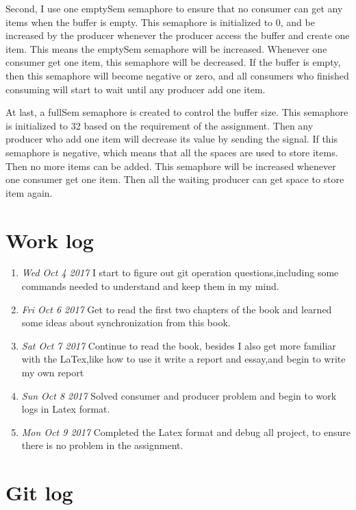 \documentclass[10pt,draftclsnofoot,peerreview,letterpaper,onecolumn,]{IEEEtran}
\begin{document}
Second, I use one emptySem semaphore to ensure that no consumer can get any items when the buffer is empty. This semaphore is initialized to 0, and be increased by the producer whenever the producer access the buffer and create one item. This means the emptySem semaphore will be increased. Whenever one consumer get one item, this semaphore will be decreased. If the buffer is empty, then this semaphore will become negative or zero, and all consumers who finished consuming will start to wait until any producer add one item.

At last, a fullSem semaphore is created to control the buffer size. This semaphore is initialized to 32 based on the requirement of the assignment. Then any producer who add one item will decrease its value by sending the signal. If this semaphore is negative, which means that all the spaces are used to store items. Then no more items can be added. This semaphore will be increased whenever one consumer get one item. Then all the waiting producer can get space to store item again.

\section{Work log}
\begin{enumerate}
\item \emph{Wed Oct 4 2017} I start to figure out git operation questions,including some commands needed to understand and keep them in my mind.
\item \emph{Fri Oct 6 2017} Get to read the first two chapters of the book and learned some ideas about synchronization from this book.
\item \emph{Sat Oct 7 2017} Continue to read the book, besides I also get more familiar with the LaTex,like how to use it write a report and essay,and begin to write my own report
\item \emph{Sun Oct 8 2017} Solved consumer and producer problem and begin to work logs in Latex format.
\item \emph{Mon Oct 9 2017} Completed the Latex format and debug all project, to ensure there is no problem in the assignment.
\end{enumerate}


\section{Git log}
\end{document}
